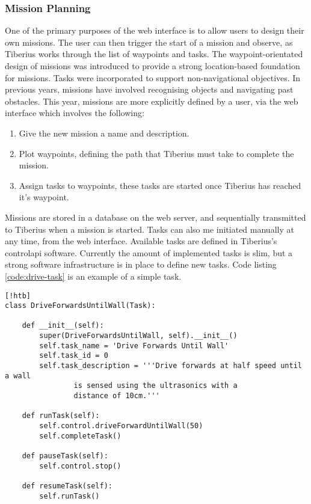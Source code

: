 \subsubsection{Mission Planning}
\label{web-missions} %
\label{sec:web_design_missions}

One of the primary purposes of the web interface is to allow users to design their own missions. The user can then trigger the start of a mission and observe, as Tiberius works through the list of waypoints and tasks.
\newline
The waypoint-orientated design of missions was introduced to provide a strong location-based foundation for missions. Tasks were incorporated to support non-navigational objectives.
\newline
In previous years, missions have involved recognising objects and navigating past obstacles. This year, missions are more explicitly defined by a user, via the web interface which involves the following:

\begin{enumerate}
\item Give the new mission a name and description.
\item Plot waypoints, defining the path that Tiberius must take to complete the mission.
\item Assign tasks to waypoints, these tasks are started once Tiberius has reached it's waypoint.
\end{enumerate}

\newline
Missions are stored in a database on the web server, and sequentially transmitted to Tiberius when a mission is started. Tasks can also me initiated manually at any time, from the web interface. Available tasks are defined in Tiberius's \gls{controlapi} software. Currently the amount of implemented tasks is slim, but a strong software infrastructure is in place to define new tasks. Code listing \ref{code:drive-task} is an example of a simple task.

\begin{lstlisting}[style=custompython,label=code:drive-task][!htb]
class DriveForwardsUntilWall(Task):

    def __init__(self):
        super(DriveForwardsUntilWall, self).__init__()
        self.task_name = 'Drive Forwards Until Wall'
        self.task_id = 0
        self.task_description = '''Drive forwards at half speed until a wall
				is sensed using the ultrasonics with a
				distance of 10cm.'''

    def runTask(self):
        self.control.driveForwardUntilWall(50)
        self.completeTask()

    def pauseTask(self):
        self.control.stop()

    def resumeTask(self):
        self.runTask()
\end{lstlisting}

